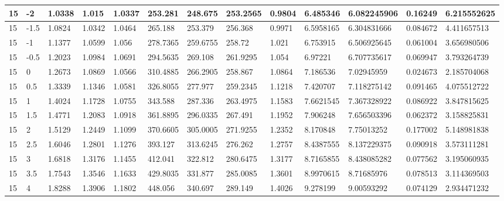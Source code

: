 \begin{longtable}{|l|l|l|l|l|l|l|l|l|l|l|l|l|}
15    & -2    & 1.0338  & 1.015   & 1.0337  & 253.281  & 248.675  & 253.2565 & 0.9804   & 6.485346    & 6.082245906    & 0.16249                  & 6.215552625 \\ \hline
15    & -1.5  & 1.0824  & 1.0342  & 1.0464  & 265.188  & 253.379  & 256.368  & 0.9971   & 6.5958165   & 6.304831666    & 0.084672                 & 4.411657513 \\ \hline
15    & -1    & 1.1377  & 1.0599  & 1.056   & 278.7365 & 259.6755 & 258.72   & 1.021    & 6.753915    & 6.506925645    & 0.061004                 & 3.656980506 \\ \hline
15    & -0.5  & 1.2023  & 1.0984  & 1.0691  & 294.5635 & 269.108  & 261.9295 & 1.054    & 6.97221     & 6.707735617    & 0.069947                 & 3.793264739 \\ \hline
15    & 0     & 1.2673  & 1.0869  & 1.0566  & 310.4885 & 266.2905 & 258.867  & 1.0864   & 7.186536    & 7.02945959     & 0.024673                 & 2.185704068 \\ \hline
15    & 0.5   & 1.3339  & 1.1346  & 1.0581  & 326.8055 & 277.977  & 259.2345 & 1.1218   & 7.420707    & 7.118275142    & 0.091465                 & 4.075512722 \\ \hline
15    & 1     & 1.4024  & 1.1728  & 1.0755  & 343.588  & 287.336  & 263.4975 & 1.1583   & 7.6621545   & 7.367328922    & 0.086922                 & 3.847815625 \\ \hline
15    & 1.5   & 1.4771  & 1.2083  & 1.0918  & 361.8895 & 296.0335 & 267.491  & 1.1952   & 7.906248    & 7.656503396    & 0.062372                 & 3.158825831 \\ \hline
15    & 2     & 1.5129  & 1.2449  & 1.1099  & 370.6605 & 305.0005 & 271.9255 & 1.2352   & 8.170848    & 7.75013252     & 0.177002                 & 5.148981838 \\ \hline
15    & 2.5   & 1.6046  & 1.2801  & 1.1276  & 393.127  & 313.6245 & 276.262  & 1.2757   & 8.4387555   & 8.137229375    & 0.090918                 & 3.573111281 \\ \hline
15    & 3     & 1.6818  & 1.3176  & 1.1455  & 412.041  & 322.812  & 280.6475 & 1.3177   & 8.7165855   & 8.438085282    & 0.077562                 & 3.195060935 \\ \hline
15    & 3.5   & 1.7543  & 1.3546  & 1.1633  & 429.8035 & 331.877  & 285.0085 & 1.3601   & 8.9970615   & 8.71685976     & 0.078513                 & 3.114369503 \\ \hline
15    & 4     & 1.8288  & 1.3906  & 1.1802  & 448.056  & 340.697  & 289.149  & 1.4026   & 9.278199    & 9.00593292     & 0.074129                 & 2.934471232 \\ \hline

\end{longtable}
